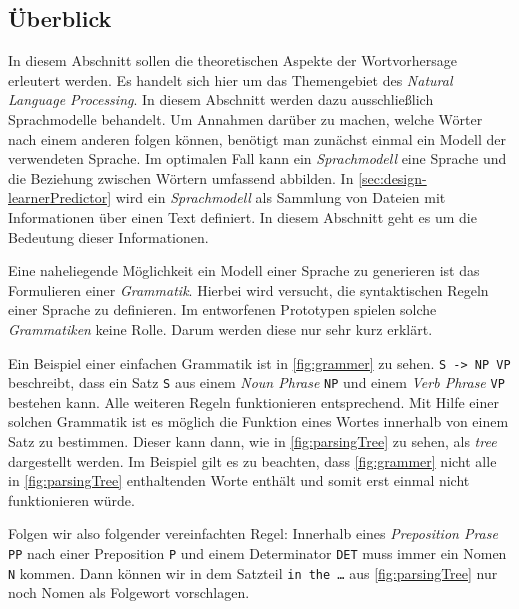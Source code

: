 \subsection{Überblick}
\label{sec:langmodels}

    In diesem Abschnitt sollen die theoretischen Aspekte der Wortvorhersage erleutert werden. Es handelt sich hier um das Themengebiet des \emph{Natural Language Processing}. In diesem Abschnitt werden dazu ausschließlich Sprachmodelle behandelt. Um Annahmen darüber zu machen, welche Wörter nach einem anderen folgen können, benötigt man zunächst einmal ein Modell der verwendeten Sprache. Im optimalen Fall kann ein \emph{Sprachmodell} eine Sprache und die Beziehung zwischen Wörtern umfassend abbilden. In \autoref{sec:design-learnerPredictor} wird ein \emph{Sprachmodell} als Sammlung von Dateien mit Informationen über einen Text definiert. In diesem Abschnitt geht es um die Bedeutung dieser Informationen.
        
    Eine naheliegende Möglichkeit ein Modell einer Sprache zu generieren ist das Formulieren einer \emph{Grammatik}. Hierbei wird versucht, die syntaktischen Regeln einer Sprache zu definieren. Im entworfenen Prototypen spielen solche \emph{Grammatiken} keine Rolle. Darum werden diese nur sehr kurz erklärt.
        
    Ein Beispiel einer einfachen Grammatik ist in \autoref{fig:grammer} zu sehen. \texttt{S -> NP VP} beschreibt, dass ein Satz \texttt{S} aus einem \emph{Noun Phrase} \texttt{NP} und einem \emph{Verb Phrase} \texttt{VP} bestehen kann. Alle weiteren Regeln funktionieren entsprechend. Mit Hilfe einer solchen Grammatik ist es möglich die Funktion eines Wortes innerhalb von einem Satz zu bestimmen. Dieser kann dann, wie in \autoref{fig:parsingTree} zu sehen,  als \emph{tree} dargestellt werden. Im Beispiel gilt es zu beachten, dass \autoref{fig:grammer} nicht alle in \autoref{fig:parsingTree} enthaltenden Worte enthält und somit erst einmal nicht funktionieren würde.
        
    Folgen wir also folgender vereinfachten Regel: Innerhalb eines \emph{Preposition Prase} \texttt{PP} nach einer Preposition \texttt{P} und einem Determinator \texttt{DET} muss immer ein Nomen \texttt{N} kommen. Dann können wir in dem Satzteil \texttt{in the …} aus \autoref{fig:parsingTree} nur noch Nomen als Folgewort vorschlagen.
        
